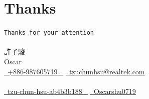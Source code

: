 \documentclass{beamer}
\begin{document}

\section{Thanks}
\begin{frame}
    \begin{center}
        \huge{\texttt{Thanks for your attention}} \\~\\
        \LARGE{許子駿} \\ \Large{Oscar} \\
        \vspace{16pt}
        \scriptsize{
            \href{tel:+886-987605719}{ \raisebox{-0.1\height}\faPhone\ \underline{+886-987605719} ~} 
            \href{mailto:vm3y3rmp40719@gmail.com}{\raisebox{-0.2\height}\faEnvelope\  \underline{tzuchunhsu@realtek.com}} \\~\\
            \href{https://www.linkedin.com/in/tzu-chun-hsu-ab4b3b188/}{\raisebox{-0.2\height}\faLinkedinSquare\ \underline{tzu-chun-hsu-ab4b3b188} ~}
            \href{https://github.com/Oscarshu0719}{\raisebox{-0.2\height}\faGithub\ \underline{Oscarshu0719}}
        }
    \end{center}
\end{frame}
\end{document}
